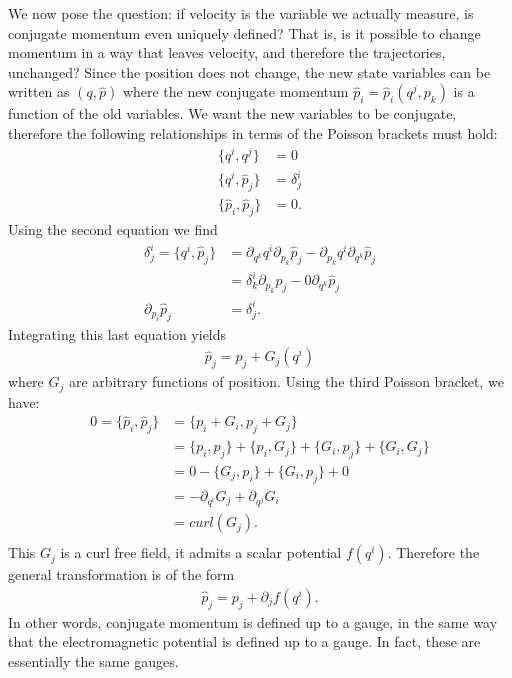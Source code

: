 We now pose the question: if velocity is the variable we actually measure, is conjugate momentum even uniquely defined? That is, is it possible to change momentum in a way that leaves velocity, and therefore the trajectories, unchanged? Since the position does not change, the new state variables can be written as $(q, \hat{p})$ where the new conjugate momentum $\hat{p}_i = \hat{p}_i(q^j, p_k)$ is a function of the old variables. We want the new variables to be conjugate, therefore the following relationships in terms of the Poisson brackets must hold:
\begin{equation}
	\begin{aligned}
		\{q^i, q^j\} &= 0 \\
		\{q^i, \hat{p}_j\} &= \delta^i_j \\
		\{\hat{p}_i, \hat{p}_j\} &= 0 .
	\end{aligned}
\end{equation}
Using the second equation we find
\begin{equation}
	\begin{aligned}
		\delta^i_j =\{q^i, \hat{p}_j\} &= \partial_{q^k} q^i \partial_{p_k} \hat{p}_j - \partial_{p_k} q^i \partial_{q^k} \hat{p}_j \\
		&= \delta^i_k \partial_{p_k} \hat{p}_j - 0 \partial_{q^k} \hat{p}_j \\
		\partial_{p_i} \hat{p}_j &= \delta^i_j.
	\end{aligned}
\end{equation}
Integrating this last equation yields
\begin{equation}\label{rp-cm-gaugeChange}
	\begin{aligned}
		\hat{p}_j = p_j + G_j(q^i)
	\end{aligned}
\end{equation}
where $G_j$ are arbitrary functions of position. Using the third Poisson bracket, we have:
\begin{equation}
	\begin{aligned}
		0 = \{\hat{p}_i, \hat{p}_j\} &= \{p_i + G_i, p_j + G_j\} \\
		&= \{p_i, p_j \} + \{p_i , G_j\} + \{G_i, p_j \} + \{G_i, G_j\} \\
		&= 0 - \{G_j, p_i\} + \{G_i, p_j \} + 0 \\
		&= - \partial_{q^i} G_j + \partial_{q^j} G_i \\
		&= curl(G_j). \\
	\end{aligned}
\end{equation}
This $G_j$ is a curl free field, it admits a scalar potential $f(q^i)$. Therefore the general transformation is of the form
\begin{equation}
	\begin{aligned}
		\hat{p}_j = p_j + \partial_j f(q^i).
	\end{aligned}
\end{equation}
In other words, conjugate momentum is defined up to a gauge, in the same way that the electromagnetic potential is defined up to a gauge. In fact, these are essentially the same gauges.

